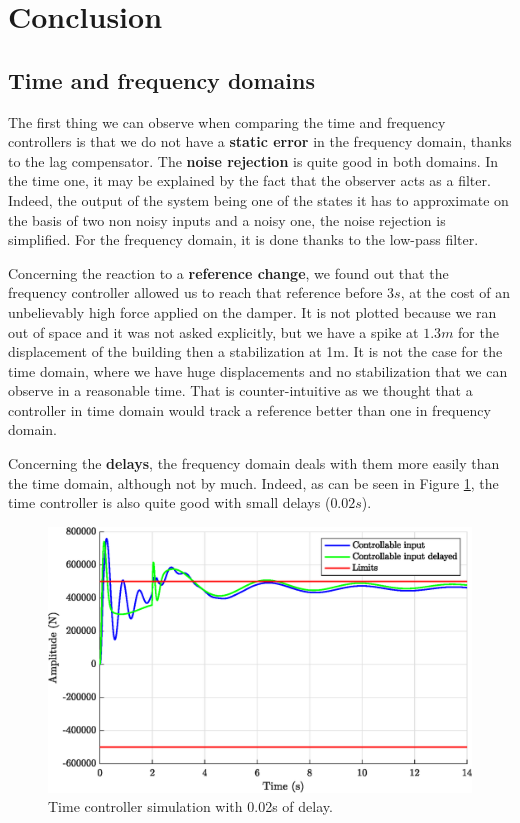 \section{Conclusion}

\subsection{Time and frequency domains}
The first thing we can observe when comparing the time and frequency controllers is that we do not have a \textbf{static error} in the frequency domain, thanks to the lag compensator. The \textbf{noise rejection} is quite good in both domains. In the time one, it may be explained by the fact that the observer acts as a filter. Indeed, the output of the system being one of the states it has to approximate on the basis of two non noisy inputs and a noisy one, the noise rejection is simplified. For the frequency domain, it is done thanks to the low-pass filter.\par
Concerning the reaction to a \textbf{reference change}, we found out that the frequency controller allowed us to reach that reference before $3s$, at the cost of an unbelievably high force applied on the damper. It is not plotted because we ran out of space and it was not asked explicitly, but we have a spike at $1.3m$ for the displacement of the building then a stabilization at 1m. It is not the case for the time domain, where we have huge displacements and no stabilization that we can observe in a reasonable time. That is counter-intuitive as we thought that a controller in time domain would track a reference better than one in frequency domain.\par
Concerning the \textbf{delays}, the frequency domain deals with them more easily than the time domain, although not by much. Indeed, as can be seen in Figure \ref{fig:delay}, the time controller is also quite good with small delays ($0.02s$).
\begin{figure}[H]
    \centering
    \includegraphics[scale = 0.7]{resources/eps/3_delay-controllable-input.eps}
    \caption{Time controller simulation with 0.02s of delay.}
    \label{fig:delay}
\end{figure}

